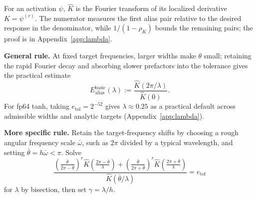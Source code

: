 For an activation \(\psi\), \(\widehat K\) is the Fourier transform of its localized derivative \(K=\psi^{(r)}\). The numerator measures the first alias pair relative to the desired response in the denominator, while \(1/(1-\rho_K)\) bounds the remaining pairs; the proof is in Appendix~\ref{app:lambda}.

\textbf{General rule.} At fixed target frequencies, larger widths make \(\theta\) small; retaining the rapid Fourier decay and absorbing slower prefactors into the tolerance gives the practical estimate
\begin{equation}
E_{\mathrm{alias}}^{\mathrm{basic}}(\lambda):=
\frac{\widehat K(2\pi/\lambda)}{\widehat K(0)}.
\label{eq:lambda-basic-rule}
\end{equation}
For fp64 tanh, taking \(e_{\mathrm{tol}}=2^{-52}\) gives \(\lambda\approx0.25\) as a practical default across admissible widths and analytic targets (Appendix~\ref{app:lambda}).

\textbf{More specific rule.} Retain the target-frequency shifts by choosing a rough angular frequency scale \(\bar\omega\), such as \(2\pi\) divided by a typical wavelength, and setting \(\bar\theta=h\bar\omega<\pi\). Solve
\begin{equation}
\frac{
\left(\frac{\bar\theta}{2\pi-\bar\theta}\right)^r
\widehat K\!\left(\frac{2\pi-\bar\theta}{\lambda}\right)
+
\left(\frac{\bar\theta}{2\pi+\bar\theta}\right)^r
\widehat K\!\left(\frac{2\pi+\bar\theta}{\lambda}\right)}
{\widehat K(\bar\theta/\lambda)}
=e_{\mathrm{tol}}
\label{eq:lambda-refined-rule}
\end{equation}
for \(\lambda\) by bisection, then set \(\gamma=\lambda/h\).
